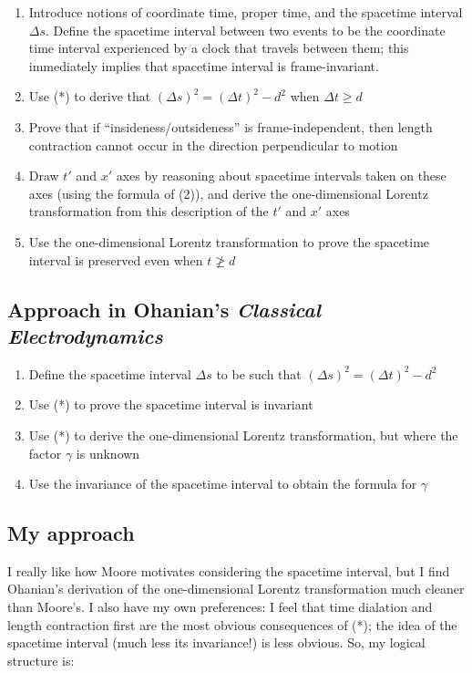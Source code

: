\documentclass{article}
\begin{document}
\begin{enumerate}
	\item Introduce notions of coordinate time, proper time, and the spacetime interval $\Delta s$. Define the spacetime interval between two events to be the coordinate time interval experienced by a clock that travels between them; this immediately implies that spacetime interval is frame-invariant.
	\item Use (*) to derive that $(\Delta s)^2 = (\Delta t)^2 - d^2$ when $\Delta t \geq d$
	\item Prove that if ``insideness/outsideness'' is frame-independent, then length contraction cannot occur in the direction perpendicular to motion
	\item Draw $t'$ and $x'$ axes by reasoning about spacetime intervals taken on these axes (using the formula of (2)), and derive the one-dimensional Lorentz transformation from this description of the $t'$ and $x'$ axes
	\item Use the one-dimensional Lorentz transformation to prove the spacetime interval is preserved even when $t \ngeq d$
\end{enumerate} 

\subsection*{Approach in Ohanian's \textit{Classical Electrodynamics}}

\begin{enumerate}
	\item Define the spacetime interval $\Delta s$ to be such that $(\Delta s)^2 = (\Delta t)^2 - d^2$
	\item Use (*) to prove the spacetime interval is invariant
	\item Use (*) to derive the one-dimensional Lorentz transformation, but where the factor $\gamma$ is unknown
	\item Use the invariance of the spacetime interval to obtain the formula for $\gamma$
\end{enumerate}

\newpage

\subsection*{My approach}

I really like how Moore motivates considering the spacetime interval, but I find Ohanian's derivation of the one-dimensional Lorentz transformation much cleaner than Moore's. I also have my own preferences: I feel that time dialation and length contraction first are the most obvious consequences of (*); the idea of the spacetime interval (much less its invariance!) is less obvious. So, my logical structure is:
\end{document}
